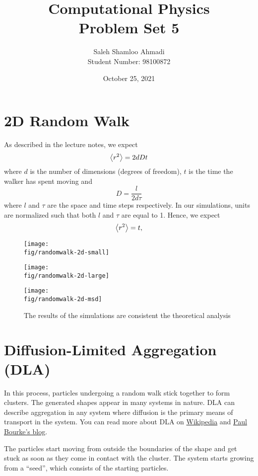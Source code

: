 \documentclass[12pt,a4paper]{article}
\title{Computational Physics\\Problem Set 5}
\author{Saleh Shamloo Ahmadi\\Student Number: 98100872}
\date{October 25, 2021}
\newcommand{\fig}{../fig}
\begin{document}
	\maketitle
	\section{2D Random Walk}
	As described in the lecture notes, we expect
	\begin{equation}
		\expval{r^2} = 2dDt
	\end{equation}
	where $d$ is the number of dimensions (degrees of freedom), $t$ is the time the walker has spent moving and
	\begin{equation}
		D = \frac{l}{2d\tau}
	\end{equation}
	where $l$ and $\tau$ are the space and time steps respectively. In our simulations, units are normalized
	such that both $l$ and $\tau$ are equal to 1. Hence, we expect
	\begin{equation}
		\expval{r^2} = t,
	\end{equation}

	\begin{figure}[htb!]
		\centering
		\texttt{[image: \\fig/randomwalk-2d-small]}
	\end{figure}
	\begin{figure}
		\centering
		\texttt{[image: \\fig/randomwalk-2d-large]}
	\end{figure}
	\begin{figure}
		\centering
		\texttt{[image: \\fig/randomwalk-2d-msd]}
		\caption{The results of the simulations are consistent the theoretical analysis}
	\end{figure}

	\section{Diffusion-Limited Aggregation (DLA)}
	In this process, particles undergoing a random walk stick together to form clusters. The generated shapes
	appear in many systems in nature. DLA can describe aggregation in any system where diffusion is the primary
	means of transport in the system. You can read more about DLA on
	\href{https://en.wikipedia.org/wiki/Mersenne_Twister}{Wikipedia} and
	\href{http://paulbourke.net/fractals/dla/}{Paul Bourke's blog}.

	The particles start moving from outside the boundaries of the shape and get stuck as soon as they come in contact
	with the cluster. The system starts growing from a \enquote{seed}, which consists of the starting particles.
\end{document}
